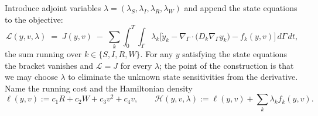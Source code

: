 \documentclass[11pt]{article}
\newcommand{\Grad}{\nabla_\Gamma}
\newcommand{\Div}{\nabla_\Gamma\cdot}
\newcommand{\Ham}{\mathcal{H}}
\newcommand{\Lag}{\mathcal{L}}
\begin{document}
Introduce adjoint variables $\lambda = (\lambda_S,\lambda_I,\lambda_R,\lambda_W)$ and append the state equations to the objective:
\begin{equation}
\Lag(y,v,\lambda) \;=\; J(y,v) \;-\; \sum_{k}\int_0^T\!\!\int_\Gamma \lambda_k\Big[\dot y_k - \Div\big(D_k\Grad y_k\big) - f_k(y,v)\Big]\,d\Gamma\,dt,
\label{eq:lagrangian}
\end{equation}
the sum running over $k\in\{S,I,R,W\}$. For any $y$ satisfying the state equations the bracket vanishes and $\Lag = J$ for every $\lambda$; the point of the construction is that we may choose $\lambda$ to eliminate the unknown state sensitivities from the derivative. Name the running cost and the Hamiltonian density
\begin{equation}
\ell(y,v) := c_1 R + c_2 W + c_3 v^2 + c_4 v, \qquad
\Ham(y,v,\lambda) := \ell(y,v) + \sum_k \lambda_k f_k(y,v).
\label{eq:hamiltonian}
\end{equation}
\end{document}
